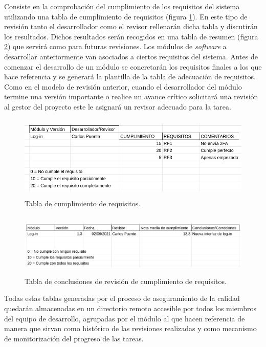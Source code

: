 \documentclass{article}
\begin{document}
Consiste en la comprobación del cumplimiento de los requisitos del sistema utilizando una tabla de cumplimiento de requisitos (figura \ref{tablaRequisitos}). En este tipo de revisión tanto el desarrollador como el revisor rellenarán dicha tabla y discutirán los resultados. Dichos resultados serán recogidos en una tabla de resumen (figura \ref{tablaConclusionesRequisitos}) que servirá como para futuras revisiones. Los módulos de \textit{software} a desarrollar anteriormente van asociados a ciertos requisitos del sistema. Antes de comenzar el desarrollo de un módulo se concretarán los requisitos finales a los que hace referencia y se generará la plantilla de la tabla de adecuación de requisitos. Como en el modelo de revisión anterior, cuando el desarrollador del módulo termine una versión importante o realice un avance crítico solicitará una revisión al gestor del proyecto este le asignará un revisor adecuado para la tarea.

\begin{figure}[H]
   \centering
       \includegraphics[height=4cm]{../images/tabla_cumplimiento_requisitos.png}
   \caption{Tabla de cumplimiento de requisitos.}
   \label{tablaRequisitos}
\end{figure}

\begin{figure}[H]
   \centering
       \includegraphics[height=3cm]{../images/tabla_conclusiones_revision_requisitos.png}
   \caption{Tabla de conclusiones de revisión de cumplimiento de requisitos.}
   \label{tablaConclusionesRequisitos}
\end{figure}

Todas estas tablas generadas por el proceso de aseguramiento de la calidad quedarán almacenadas en un directorio remoto accesible por todos los miembros del equipo de desarrollo, agrupadas por el módulo al que hacen referencia de manera que sirvan como histórico de las revisiones realizadas y como mecanismo de monitorización del progreso de las tareas.
\end{document}
